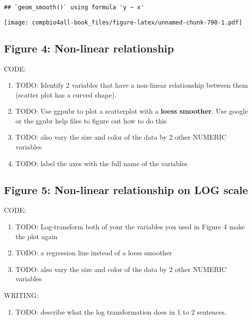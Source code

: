 \documentclass[
]{book}
\providecommand{\tightlist}{%
  \setlength{\itemsep}{0pt}\setlength{\parskip}{0pt}}
\begin{document}
\begin{verbatim}
## `geom_smooth()` using formula 'y ~ x'
\end{verbatim}

\texttt{[image: compbio4all-book\_files/figure-latex/unnamed-chunk-790-1.pdf]}

\hypertarget{figure-4-non-linear-relationship-1}{%
\subsection{Figure 4: Non-linear relationship}\label{figure-4-non-linear-relationship-1}}

CODE:

\begin{enumerate}
\def\labelenumi{\arabic{enumi}.}
\tightlist
\item
  TODO: Identify 2 variables that have a non-linear relationship between them (scatter plot has a curved shape).
\item
  TODO: Use ggpubr to plot a scatterplot with a \textbf{loess smoother}. Use google or the ggubr help files to figure out how to do this
\item
  TODO: also vary the size and color of the data by 2 other NUMERIC variables
\item
  TODO: label the axes with the full name of the variables
\end{enumerate}

\hypertarget{figure-5-non-linear-relationship-on-log-scale-1}{%
\subsection{Figure 5: Non-linear relationship on LOG scale}\label{figure-5-non-linear-relationship-on-log-scale-1}}

CODE:

\begin{enumerate}
\def\labelenumi{\arabic{enumi}.}
\tightlist
\item
  TODO: Log-transform both of your the variables you used in Figure 4 make the plot again
\item
  TODO: a regression line instead of a loess smoother
\item
  TODO: also vary the size and color of the data by 2 other NUMERIC variables
\end{enumerate}

WRITING:

\begin{enumerate}
\def\labelenumi{\arabic{enumi}.}
\tightlist
\item
  TODO: describe what the log transformation does in 1 to 2 sentences.
\end{enumerate}
\end{document}
